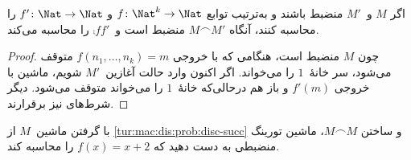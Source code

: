 \documentclass[../../../include/open-logic-section]{subfiles}
\begin{document}
\begin{prop}
    اگر $M$ و~$M'$ منضبط باشند و به‌ترتیب توابع
    $f\colon\Nat^k\to\Nat$ و $f'\colon\Nat\to\Nat$ را محاسبه کنند،
    آنگاه $M\frown M'$ منضبط است و~$\comp{f}{f'}$ را محاسبه می‌کند.
\end{prop}

\begin{proof}
    چون $M$ منضبط است، هنگامی که با خروجی
    $f(n_1,\dots,n_k)=m$ متوقف می‌شود، سر خانهٔ~$1$ را می‌خواند. اگر
    اکنون وارد حالت آغازین~$M'$ شویم، ماشین با خروجی $f'(m)$ و باز هم
    درحالی‌که خانهٔ~$1$ را می‌خواند متوقف می‌شود. دیگر شرط‌های
     نیز برقرارند.
\end{proof}

\begin{prob}
    با گرفتن ماشین~$M$ از \cref{tur:mac:dis:prob:disc-succ} و ساختن
    $M\frown M$، ماشین تورینگ منضبطی به دست دهید که $f(x)=x+2$ را
    محاسبه کند.
\end{prob}
\end{document}
